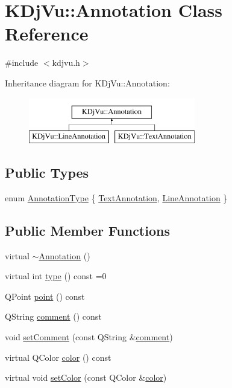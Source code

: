 \hypertarget{classKDjVu_1_1Annotation}{\section{K\+Dj\+Vu\+:\+:Annotation Class Reference}
\label{classKDjVu_1_1Annotation}
}


{\ttfamily \#include $<$kdjvu.\+h$>$}

Inheritance diagram for K\+Dj\+Vu\+:\+:Annotation\+:\begin{figure}[H]
\begin{center}
\leavevmode
\includegraphics[height=2.000000cm]{classKDjVu_1_1Annotation}
\end{center}
\end{figure}
\subsection*{Public Types}
\begin{DoxyCompactItemize}
\item 
enum \hyperlink{classKDjVu_1_1Annotation_add3feb5fc9e9f7c314afe748c6cf9225}{Annotation\+Type} \{ \hyperlink{classKDjVu_1_1Annotation_add3feb5fc9e9f7c314afe748c6cf9225a435588b8a413abf8c6ec4cb75de5cbde}{Text\+Annotation}, 
\hyperlink{classKDjVu_1_1Annotation_add3feb5fc9e9f7c314afe748c6cf9225aaa9aec60ff07ae12d2b78bbe7add4982}{Line\+Annotation}
 \}
\end{DoxyCompactItemize}
\subsection*{Public Member Functions}
\begin{DoxyCompactItemize}
\item 
virtual \hyperlink{classKDjVu_1_1Annotation_aa9b78fa9a2c4fb2673fcb6dd520dff9f}{$\sim$\+Annotation} ()
\item 
virtual int \hyperlink{classKDjVu_1_1Annotation_a6930b9190e07f47ba5bb097c95f028c5}{type} () const =0
\item 
Q\+Point \hyperlink{classKDjVu_1_1Annotation_ad82c8ab404f11542fdf54d991bfabbf1}{point} () const 
\item 
Q\+String \hyperlink{classKDjVu_1_1Annotation_a156a238b4d2976ab26141e2005bdf822}{comment} () const 
\item 
void \hyperlink{classKDjVu_1_1Annotation_ac43d8309a00f9db14a80ca0e5c0a3a0e}{set\+Comment} (const Q\+String \&\hyperlink{classKDjVu_1_1Annotation_a156a238b4d2976ab26141e2005bdf822}{comment})
\item 
virtual Q\+Color \hyperlink{classKDjVu_1_1Annotation_a7135ef982f0794b604232fa2802a3770}{color} () const 
\item 
virtual void \hyperlink{classKDjVu_1_1Annotation_a9ed0bebe3716db841d9bed53bb08acbe}{set\+Color} (const Q\+Color \&\hyperlink{classKDjVu_1_1Annotation_a7135ef982f0794b604232fa2802a3770}{color})
\end{DoxyCompactItemize}
